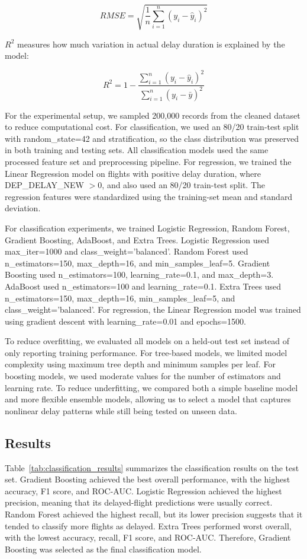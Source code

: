 \[
RMSE=\sqrt{\frac{1}{n}\sum_{i=1}^{n}(y_i-\hat{y}_i)^2}
\]

\(R^2\) measures how much variation in actual delay duration is explained by the model:

\[
R^2=1-\frac{\sum_{i=1}^{n}(y_i-\hat{y}_i)^2}{\sum_{i=1}^{n}(y_i-\bar{y})^2}
\]

For the experimental setup, we sampled 200,000 records from the cleaned dataset to reduce computational cost. For classification, we used an 80/20 train-test split with random\_state=42 and stratification, so the class distribution was preserved in both training and testing sets. All classification models used the same processed feature set and preprocessing pipeline. For regression, we trained the Linear Regression model on flights with positive delay duration, where DEP\_DELAY\_NEW \(>0\), and also used an 80/20 train-test split. The regression features were standardized using the training-set mean and standard deviation.

For classification experiments, we trained Logistic Regression, Random Forest, Gradient Boosting, AdaBoost, and Extra Trees. Logistic Regression used max\_iter=1000 and class\_weight='balanced'. Random Forest used n\_estimators=150, max\_depth=16, and min\_samples\_leaf=5. Gradient Boosting used n\_estimators=100, learning\_rate=0.1, and max\_depth=3. AdaBoost used n\_estimators=100 and learning\_rate=0.1. Extra Trees used n\_estimators=150, max\_depth=16, min\_samples\_leaf=5, and class\_weight='balanced'. For regression, the Linear Regression model was trained using gradient descent with learning\_rate=0.01 and epochs=1500.

To reduce overfitting, we evaluated all models on a held-out test set instead of only reporting training performance. For tree-based models, we limited model complexity using maximum tree depth and minimum samples per leaf. For boosting models, we used moderate values for the number of estimators and learning rate. To reduce underfitting, we compared both a simple baseline model and more flexible ensemble models, allowing us to select a model that captures nonlinear delay patterns while still being tested on unseen data.

\subsection{Results} 

Table~\ref{tab:classification_results} summarizes the classification results on the test set. Gradient Boosting achieved the best overall performance, with the highest accuracy, F1 score, and ROC-AUC. Logistic Regression achieved the highest precision, meaning that its delayed-flight predictions were usually correct. Random Forest achieved the highest recall, but its lower precision suggests that it tended to classify more flights as delayed. Extra Trees performed worst overall, with the lowest accuracy, recall, F1 score, and ROC-AUC. Therefore, Gradient Boosting was selected as the final classification model.


